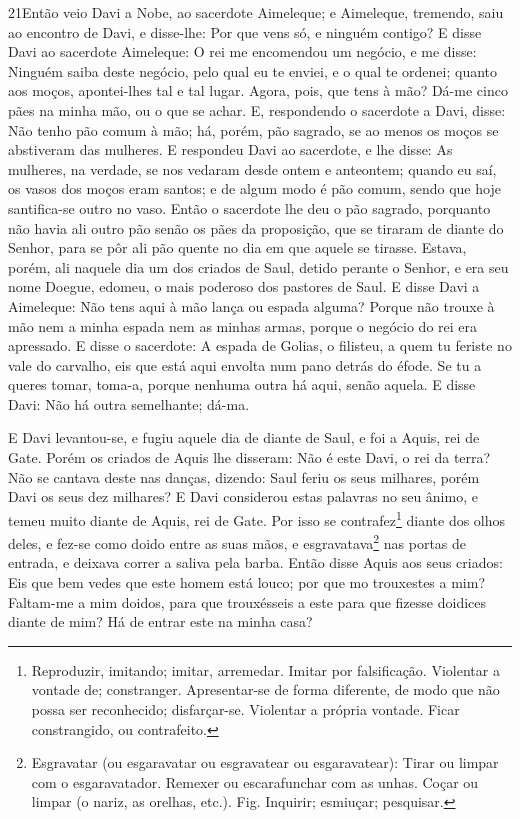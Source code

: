 \medskip

\lettrine{21} Então veio Davi a Nobe, ao sacerdote Aimeleque;
e Aimeleque, tremendo, saiu ao encontro de Davi, e disse-lhe: Por
que vens só, e ninguém contigo? E disse Davi ao sacerdote
Aimeleque: O rei me encomendou um negócio, e me disse: Ninguém saiba
deste negócio, pelo qual eu te enviei, e o qual te ordenei; quanto
aos moços, apontei-lhes tal e tal lugar. Agora, pois, que tens à
mão? Dá-me cinco pães na minha mão, ou o que se achar. E,
respondendo o sacerdote a Davi, disse: Não tenho pão comum à mão;
há, porém, pão sagrado, se ao menos os moços se abstiveram das
mulheres. E respondeu Davi ao sacerdote, e lhe disse: As
mulheres, na verdade, se nos vedaram desde ontem e anteontem; quando
eu saí, os vasos dos moços eram santos; e de algum modo é pão comum,
sendo que hoje santifica-se outro no vaso. Então o sacerdote lhe
deu o pão sagrado, porquanto não havia ali outro pão senão os pães
da proposição, que se tiraram de diante do Senhor, para se pôr ali
pão quente no dia em que aquele se tirasse. Estava, porém, ali
naquele dia um dos criados de Saul, detido perante o Senhor, e era
seu nome Doegue, edomeu, o mais poderoso dos pastores de Saul. E
disse Davi a Aimeleque: Não tens aqui à mão lança ou espada alguma?
Porque não trouxe à mão nem a minha espada nem as minhas armas,
porque o negócio do rei era apressado. E disse o sacerdote: A
espada de Golias, o filisteu, a quem tu feriste no vale do carvalho,
eis que está aqui envolta num pano detrás do éfode. Se tu a queres
tomar, toma-a, porque nenhuma outra há aqui, senão aquela. E disse
Davi: Não há outra semelhante; dá-ma.

E Davi levantou-se, e fugiu aquele dia de diante de Saul, e foi a
Aquis, rei de Gate. Porém os criados de Aquis lhe disseram:
Não é este Davi, o rei da terra? Não se cantava deste nas danças,
dizendo: Saul feriu os seus milhares, porém Davi os seus dez
milhares? E Davi considerou estas palavras no seu ânimo, e
temeu muito diante de Aquis, rei de Gate. Por isso se
contrafez\footnote{Reproduzir, imitando; imitar, arremedar. Imitar
por falsificação. Violentar a vontade de; constranger. Apresentar-se
de forma diferente, de modo que não possa ser reconhecido;
disfarçar-se. Violentar a própria vontade. Ficar constrangido, ou
contrafeito.} diante dos olhos deles, e fez-se como doido entre as
suas mãos, e esgravatava\footnote{Esgravatar (ou esgaravatar ou
esgravatear ou esgaravatear): Tirar ou limpar com o esgaravatador.
Remexer ou escarafunchar com as unhas. Coçar ou limpar (o nariz, as
orelhas, etc.). Fig. Inquirir; esmiuçar; pesquisar.} nas portas de
entrada, e deixava correr a saliva pela barba. Então disse
Aquis aos seus criados: Eis que bem vedes que este homem está louco;
por que mo trouxestes a mim? Faltam-me a mim doidos, para que
trouxésseis a este para que fizesse doidices diante de mim? Há de
entrar este na minha casa?

